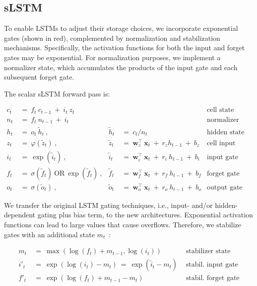 \subsection{sLSTM}
\label{sec:sLSTM}

To enable LSTMs to adjust their storage choices, we incorporate exponential gates (shown in red), complemented by normalization and stabilization mechanisms. Specifically, the activation functions for both the input and forget gates may be exponential. For normalization purposes, we implement a normalizer state, which accumulates the products of the input gate and each subsequent forget gate.

The scalar sLSTM forward pass is:

\begin{align}
\label{eq:slstmforward}
c_t \ &= \  f_t \ c_{t-1} \ + \ i_t \ z_t & & 
 &\text{cell state} \\
n_t \ &= \  f_t \ n_{t-1} \ + \ i_t  & & 
 &\text{normalizer state} \\
h_t \ &= \ o_t \ \tilde{h}_t \ ,
  &\tilde{h}_t \ &= \ c_t / n_t
&\text{hidden state} \\
z_t \ &= \ \varphi \left( \tilde{z}_t \right) \ , 
  &\tilde{z}_t \ &=  \ \mathbf{w}^\top_{z} \ \mathbf{x}_t \ + \
  r_{z}  h_{t-1} \ + \  b_{z}
  &\text{cell input} \\
i_t \ &= \ \!\exp \left( \tilde{i}_t  \right) \ , 
  &\tilde{i}_t \ &= \ \mathbf{w}^\top_{i} \ \mathbf{x}_t \ + \
  r_{i}  \ h_{t-1} \ + \  b_{i}
  &\text{input gate} \\
f_t \ &= \ \sigma \left(  \tilde{f}_t \right) \ \text{OR} \
\!\exp \left(  \tilde{f}_t \right) \ ,
  &\tilde{f}_t \ &= \ \mathbf{w}^\top_{f} \ \mathbf{x}_t  \ + \
  r_{f}  \ h_{t-1} \ + \  b_{f}
  &\text{forget gate} \\
o_t \ &= \ \sigma \left( \tilde{o}_t \right) \ , 
  &\tilde{o}_t  \ &= \ \mathbf{w}^\top_{o} \ \mathbf{x}_t \ + \
  r_{o}  \ h_{t-1} \ + \  b_{o}
  &\text{output gate} 
\end{align}

We transfer the original LSTM gating techniques, i.e., input- and/or hidden-dependent gating plus bias term, to the new architectures. Exponential activation functions can lead to large values that cause overflows. Therefore, we stabilize gates with an additional state \mbox{$m_t$~\citep{Milakov:18arxiv}}:

\begin{align}
\label{eq:slstmstabil}
m_t \ &= \ \max \left( \log ( f_t ) + m_{t-1} , \log ( i_t ) \right) &\text{stabilizer state} \\
i'_t \ &= \ \!\exp \left( \log \left ( i_t \right) - m_t \right) \ = \ \!\exp \left( \tilde{i}_t - m_t \right) \ \, 
  &\text{stabil. input gate} \\
f'_t \ &= \ \!\exp \left( \log \left( f_t \right) + m_{t-1} - m_t \right) \ \, 
  &\text{stabil. forget gate}
\end{align}

